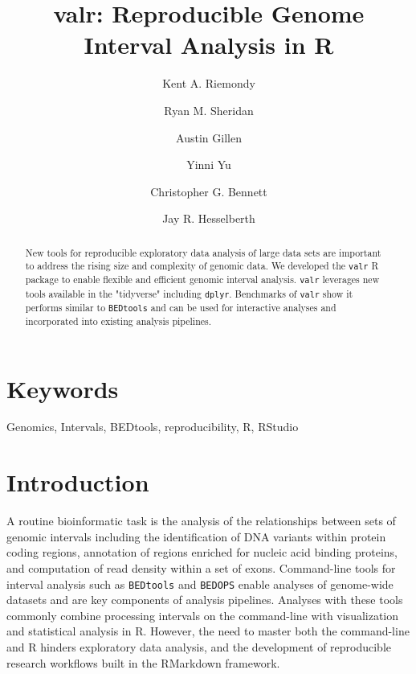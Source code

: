 \documentclass[9pt,a4paper]{extarticle}
\begin{document}
\pagestyle{front}

\title{valr: Reproducible Genome Interval Analysis in R}
\author[1]{Kent A. Riemondy}
\author[2]{Ryan M. Sheridan}
\author[1]{Austin Gillen}
\author[2]{Yinni Yu}
\author[3]{Christopher G. Bennett}
\author[1,2,*]{Jay R. Hesselberth}


\maketitle
\thispagestyle{front}

\begin{abstract}
New tools for reproducible exploratory data analysis of large data sets are important to address the rising size and complexity of genomic data. We developed the \texttt{valr} R package to enable flexible and efficient genomic interval analysis. \texttt{valr} leverages new tools available in the "tidyverse" including \texttt{dplyr}. Benchmarks of \texttt{valr} show it performs similar to \texttt{BEDtools} and can be used for interactive analyses and incorporated into existing analysis pipelines.

\end{abstract}

\section*{Keywords}

Genomics, Intervals, BEDtools, reproducibility, R, RStudio

\clearpage
\pagestyle{main}
\section*{Introduction}

	A routine bioinformatic task is the analysis of the relationships between sets of genomic intervals including the identification of DNA variants within protein coding regions, annotation of regions enriched for nucleic acid binding proteins, and computation of read density within a set of exons. Command-line tools for interval analysis such as \texttt{BEDtools} \cite{quinlan_bedtools:_2010} and \texttt{BEDOPS} \cite{neph_bedops:_2012} enable analyses of genome-wide datasets and are key components of analysis pipelines. Analyses with these tools commonly combine processing intervals on the command-line with visualization and statistical analysis in R. However, the need to master both the command-line and R hinders exploratory data analysis, and the development of reproducible research workflows built in the RMarkdown framework.
\end{document}
